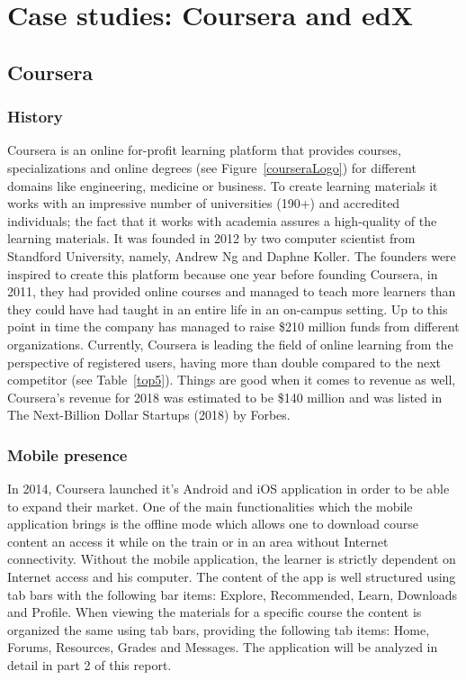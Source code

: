 \documentclass[11]{article}
\begin{document}
\pagebreak	
\section{Case studies: Coursera and edX}

	\subsection{Coursera}

\subsubsection{History}
	Coursera is an online for-profit learning platform that provides courses, specializations and online degrees (see Figure~\ref{courseraLogo}) for different domains like engineering, medicine or business. To create learning materials it works with an impressive number of universities (190+) and accredited individuals; the fact that it works with academia assures a high-quality of the learning materials. It was founded in 2012 by two computer scientist from Standford University, namely, Andrew Ng and Daphne Koller. The founders were inspired to create this platform because one year before founding Coursera, in 2011, they had provided online courses and managed to teach more learners than they could have had taught in an entire life in an on-campus setting. Up to this point in time the company has managed to raise \$210 million funds from different organizations. Currently, Coursera is leading the field of online learning from the perspective of registered users, having more than double compared to the next competitor (see Table~\ref{top5}). Things are good when it comes to revenue as well, Coursera's revenue for 2018 was estimated to be \$140 million and was listed in The Next-Billion Dollar Startups (2018) by Forbes. 
	\indent

\subsubsection{Mobile presence}
	In 2014, Coursera launched it's Android and iOS application in order to be able to expand their market. One of the main functionalities which the mobile application brings is the offline mode which allows one to download course content an access it while on the train or in an area without Internet connectivity. Without the mobile application, the learner is strictly dependent on Internet access and his computer.  The content of the app is well structured using tab bars with the following bar items: Explore, Recommended, Learn, Downloads and Profile. When viewing the materials for a specific course the content is organized the same using tab bars, providing the following tab items: Home, Forums, Resources, Grades and Messages. The application will be analyzed in detail in  part 2 of this report.\\
\end{document}
